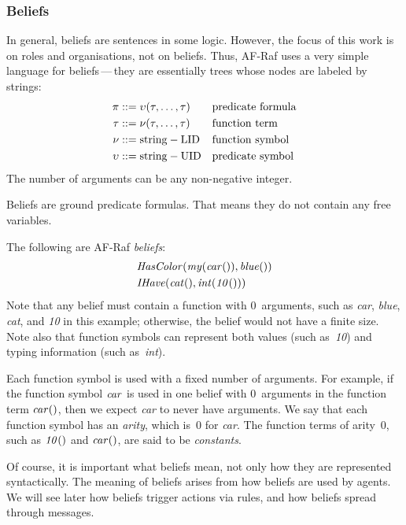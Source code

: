 \documentclass[a4paper,12pt,oneside,fleqn]{book} %
\begin{document}
\subsubsection{Beliefs}

In general, beliefs are sentences in some logic.  However, the focus of
this work is on roles and organisations, not on beliefs.  Thus, AF-Raf uses
a very simple language for beliefs\,---\,they are essentially trees whose
nodes are labeled by strings: \begin{align} \pi &::=
\upsilon(\tau,\ldots,\tau) && \text{predicate formula} \\ \tau &::= \nu(\tau,\ldots,\tau)
&& \text{function term} \\ \nu  &::= {\rm string-LID} &&\text{function symbol}
\\ \upsilon  &::= {\rm string-UID} &&\text{predicate symbol} \end{align} The number of arguments can be any non-negative integer.

Beliefs are ground predicate formulas. That means they do not contain any
free variables.

\begin{example}
The following are AF-Raf \emph{beliefs}:
\begin{align}
&{\it HasColor}({\it my}({\it car}()), {\it blue}()) \\
&{\it IHave}({\it cat}(), {\it int}({\it 10}()))
\end{align}
Note that any belief must contain a function with $0$~arguments, such as
{\it car}, {\it blue}, {\it cat}, and {\it 10\/} in this example;
otherwise, the belief would not have a finite size.  Note also that
function symbols can represent both values (such as~{\it 10\/}) and typing
information (such as~{\it int\/}).
\end{example}

Each function symbol is used with a fixed number of arguments.  For
example, if the function symbol ${\it car}$ is used in one belief with
$0$~arguments in the function term ${\it car}()$, then we expect {\it
car\/} to never have arguments.  We say that each function symbol has an
\emph{arity}, which is~$0$ for {\it car}.  The function terms of arity~$0$,
such as ${\it 10}()$ and ${\it car}()$, are said to be \emph{constants}.

\begin{remark}
Of course, it is important what beliefs mean, not only how they are
represented syntactically.  The meaning of beliefs arises from how beliefs
are used by agents.  We will see later how beliefs trigger actions via
rules, and how beliefs spread through messages.
\end{remark}
\end{document}
